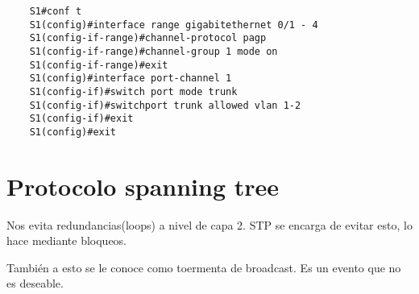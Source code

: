 \begin{lstlisting}
    S1#conf t
    S1(config)#interface range gigabitethernet 0/1 - 4
    S1(config-if-range)#channel-protocol pagp 
    S1(config-if-range)#channel-group 1 mode on
    S1(config-if-range)#exit 
    S1(config)#interface port-channel 1
    S1(config-if)#switch port mode trunk 
    S1(config-if)#switchport trunk allowed vlan 1-2
    S1(config-if)#exit 
    S1(config)#exit
\end{lstlisting}

\chapter{Protocolo spanning tree}
Nos evita redundancias(loops) a nivel de capa 2. STP se encarga de evitar esto, lo hace mediante bloqueos.

También a esto se le conoce como toermenta de broadcast. Es un evento que no es deseable. 